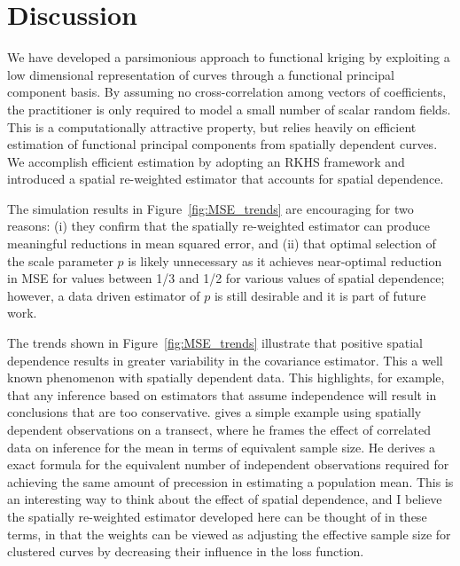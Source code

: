 
\section{Discussion} %
\label{sec:discussion}
 We have developed a parsimonious approach to functional kriging by exploiting a low dimensional representation of curves through a functional principal component basis. By assuming no cross-correlation among vectors of coefficients, the practitioner is only required to model a small number of scalar random fields. This is a computationally attractive property, but relies heavily on efficient estimation of functional principal components from spatially dependent curves.  We accomplish efficient estimation by adopting an RKHS framework and introduced a spatial re-weighted estimator that accounts for spatial dependence. 
 
 The simulation results in Figure~\ref{fig:MSE_trends} are encouraging for two reasons: (i) they confirm that the spatially re-weighted estimator can produce meaningful reductions in mean squared error, and (ii) that optimal selection of the scale parameter $p$ is likely unnecessary as it achieves near-optimal reduction in MSE for values between 1/3 and 1/2 for various values of spatial dependence; however, a data driven estimator of $p$ is still desirable and it is part of future work.

The trends shown in Figure~\ref{fig:MSE_trends} illustrate that positive spatial dependence results in greater variability in the covariance estimator. This a well known phenomenon with spatially dependent data. This highlights, for example, that any inference based on estimators that assume independence will result in conclusions that are too conservative. \cite{cressie1993statistics} gives a simple example using spatially dependent observations on a transect, where he frames the effect of correlated data on inference for the mean in terms of equivalent sample size. He derives a exact formula for the equivalent number of independent observations required for achieving the same amount of precession in estimating a population mean. This is an interesting way to think about the effect of spatial dependence, and I believe the spatially re-weighted estimator developed here can be thought of in these terms, in that the weights can be viewed as adjusting the effective sample size for clustered curves by decreasing their influence in the loss function. 


